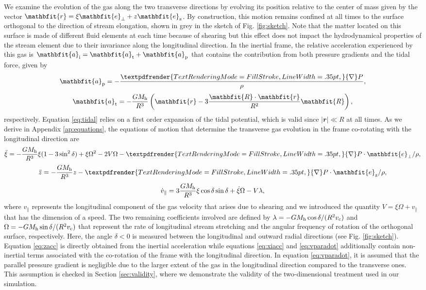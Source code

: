 \documentclass[a4paper,fleqn,usenatbib]{mnras}
\newcommand{\be}{\begin{equation}}
\newcommand{\ee}{\end{equation}}
\newcommand{\vect}[1]{\mathbfit{#1}}
\newcommand{\mh}{M_{\rm h}}
\newcommand*{\boldgreek}[1]{%
  \textpdfrender{%
    TextRenderingMode=FillStroke,%
    LineWidth=.35pt,%
  }{#1}%
}
\begin{document}
We examine the evolution of the gas along the two transverse directions by evolving its position relative to the center of mass given by  the vector $\vect{r} = \xi \vect{e}_{\perp} + z \vect{e}_{\rm z}$. By construction, this motion remains confined at all times to the surface orthogonal to the direction of stream elongation, shown in grey in the sketch of Fig. \ref{fig:sketch}. Note that the matter located on this surface is made of different fluid elements at each time because of shearing but this effect does not impact the hydrodynamical properties of the stream element due to their invariance along the longitudinal direction. In the inertial frame, the relative acceleration experienced by this gas is $\vect{a}_{\rm i} = \vect{a}_{\rm t} + \vect{a}_{\rm p}$ that contains the contribution from both pressure gradients and the tidal force, given by
\be
\vect{a}_{\rm p} = - \frac{\boldgreek{\nabla} P}{ \rho},
\ee
\be
\vect{a}_{\rm t} = - \frac{G \mh}{R^3} \left( \vect{r} - 3 \frac{\vect{R} \cdot \vect{r} }{R^2} \vect{R}  \right),
\label{eq:tidal}
\ee
respectively. Equation \eqref{eq:tidal} relies on a first order expansion of the tidal potential, which is valid since $|\vect{r}| \ll R$ at all times. As we derive in Appendix \ref{ap:equations}, the equations of motion that determine the transverse gas evolution in the frame co-rotating with the longitudinal direction are 
\be
\ddot{\xi} = -\frac{G \mh}{R^3} \xi (1-3 \sin^2 \delta) + \xi \Omega^2 - 2 V \Omega - \boldgreek{\nabla} P \cdot \vect{e}_{\perp} / \rho,
\label{eq:xiacc}
\ee
\be
\ddot{z} = -\frac{G \mh}{R^3} z - \boldgreek{\nabla} P \cdot \vect{e}_{\rm z} / \rho,
\label{eq:zacc}
\ee
\be
\dot{v}_{\parallel} = 3 \frac{G \mh}{R^3} \xi \cos \delta \sin \delta + \dot{\xi} \Omega - V \lambda,
\label{eq:vparadot}
\ee
where $v_{\parallel}$ represents the longitudinal component of the gas velocity that arises due to shearing and we introduced the quantity $V = \xi \Omega + v_{\parallel}$ that has the dimension of a speed. The two remaining coefficients involved are defined by $\lambda = -G \mh \cos \delta / (R^2 v_{\rm c})$ and $\Omega = -G \mh \sin \delta / (R^2 v_{\rm c})$ that represent the rate of longitudinal stream stretching and the angular frequency of rotation of the orthogonal surface, respectively. Here, the angle $\delta < 0$ is measured between the longitudinal and outward radial directions (see Fig. \ref{fig:sketch}). Equation \eqref{eq:zacc} is directly obtained from the inertial acceleration while equations \eqref{eq:xiacc} and \eqref{eq:vparadot} additionally contain non-inertial terms associated with the co-rotation of the frame with the longitudinal direction. In equation \eqref{eq:vparadot}, it is assumed that the parallel pressure gradient is negligible due to the larger extent of the gas in the longitudinal direction compared to the transverse ones. This assumption is checked in Section \ref{sec:validity}, where we demonstrate the validity of the two-dimensional treatment used in our simulation.
\end{document}
